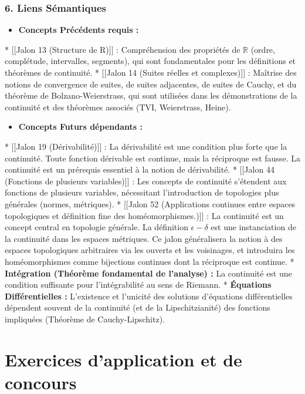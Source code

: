 \documentclass[12pt,a4paper]{report}
\begin{document}
\subsection{6. Liens Sémantiques}
\begin{itemize}
\item \textbf{Concepts Précédents requis :}
\end{itemize}
    *   [[Jalon 13 (Structure de R)]] : Compréhension des propriétés de $\mathbb{R}$ (ordre, complétude, intervalles, segments), qui sont fondamentales pour les définitions et théorèmes de continuité.
    *   [[Jalon 14 (Suites réelles et complexes)]] : Maîtrise des notions de convergence de suites, de suites adjacentes, de suites de Cauchy, et du théorème de Bolzano-Weierstrass, qui sont utilisées dans les démonstrations de la continuité et des théorèmes associés (TVI, Weierstrass, Heine).
\begin{itemize}
\item \textbf{Concepts Futurs dépendants :}
\end{itemize}
    *   [[Jalon 19 (Dérivabilité)]] : La dérivabilité est une condition plus forte que la continuité. Toute fonction dérivable est continue, mais la réciproque est fausse. La continuité est un prérequis essentiel à la notion de dérivabilité.
    *   [[Jalon 44 (Fonctions de plusieurs variables)]] : Les concepts de continuité s'étendent aux fonctions de plusieurs variables, nécessitant l'introduction de topologies plus générales (normes, métriques).
    *   [[Jalon 52 (Applications continues entre espaces topologiques et définition fine des homéomorphismes.)]] : La continuité est un concept central en topologie générale. La définition $\epsilon-\delta$ est une instanciation de la continuité dans les espaces métriques. Ce jalon généralisera la notion à des espaces topologiques arbitraires via les ouverts et les voisinages, et introduira les homéomorphismes comme bijections continues dont la réciproque est continue.
    *   \textbf{Intégration (Théorème fondamental de l'analyse) :} La continuité est une condition suffisante pour l'intégrabilité au sens de Riemann.
    *   \textbf{Équations Différentielles :} L'existence et l'unicité des solutions d'équations différentielles dépendent souvent de la continuité (et de la Lipschitzianité) des fonctions impliquées (Théorème de Cauchy-Lipschitz).

\chapter{Exercices d'application et de concours}
\end{document}
